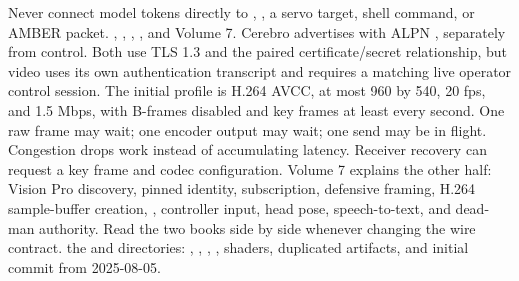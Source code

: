 {}Never connect model tokens directly to , , a servo target, shell command, or AMBER packet.\markdownRendererInterblockSeparator
{}
\markdownRendererSectionEnd \markdownRendererSectionBegin
{}\markdownRendererInterblockSeparator
{}\markdownRendererBlockQuoteBegin
{} , , , , and Volume 7.\markdownRendererBlockQuoteEnd \markdownRendererInterblockSeparator
{}Cerebro advertises  with ALPN , separately from  control. Both use TLS 1.3 and the paired certificate/secret relationship, but video uses its own authentication transcript and requires a matching live operator control session.\markdownRendererParagraphSeparator
{}The initial profile is H.264 AVCC, at most 960 by 540, 20 fps, and 1.5 Mbps, with B-frames disabled and key frames at least every second. One raw frame may wait; one encoder output may wait; one send may be in flight. Congestion drops work instead of accumulating latency. Receiver recovery can request a key frame and codec configuration.\markdownRendererParagraphSeparator
{}Volume 7 explains the other half: Vision Pro discovery, pinned identity, subscription, defensive framing, H.264 sample-buffer creation, , controller input, head pose, speech-to-text, and dead-man authority. Read the two books side by side whenever changing the wire contract.\markdownRendererInterblockSeparator
{}
\markdownRendererSectionEnd \markdownRendererSectionBegin
{}\markdownRendererInterblockSeparator
{}\markdownRendererBlockQuoteBegin
{} the  and  directories: , , , , shaders, duplicated  artifacts, and initial commit  from 2025-08-05.\markdownRendererBlockQuoteEnd \markdownRendererInterblockSeparator
